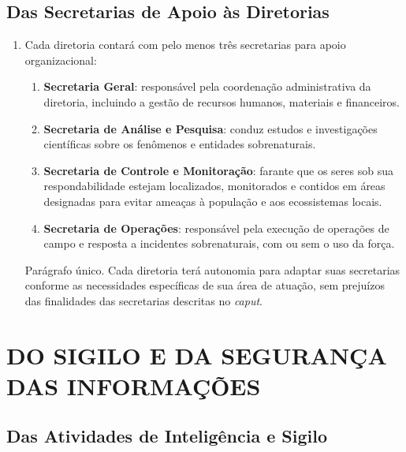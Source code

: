 \documentclass[a4paper,12pt]{report}
\begin{document}
\section{Das Secretarias de Apoio às Diretorias}

\begin{enumerate}[resume, label=Art. \arabic*]

\item Cada diretoria contará com pelo menos três secretarias para apoio organizacional:

\begin{enumerate}[label=\roman*.]

\item \textbf{Secretaria Geral}: responsável pela coordenação administrativa da diretoria, incluindo a gestão de recursos humanos, materiais e financeiros.

\item \textbf{Secretaria de Análise e Pesquisa}: conduz estudos e investigações científicas sobre os fenômenos e entidades sobrenaturais.

\item \textbf{Secretaria de Controle e Monitoração}: farante que os seres sob sua respondabilidade estejam localizados, monitorados e contidos em áreas designadas para evitar ameaças à população e aos ecossistemas locais. 

\item \textbf{Secretaria de Operações}: responsável pela execução de operações de campo e resposta a incidentes sobrenaturais, com ou sem o uso da força.

\end{enumerate}

Parágrafo único. Cada diretoria terá autonomia para adaptar suas secretarias conforme as necessidades específicas de sua área de atuação, sem prejuízos das finalidades das secretarias descritas no \textit{caput}.

\end{enumerate}

\chapter{DO SIGILO E DA SEGURANÇA DAS INFORMAÇÕES}

\section{Das Atividades de Inteligência e Sigilo}
\end{document}
